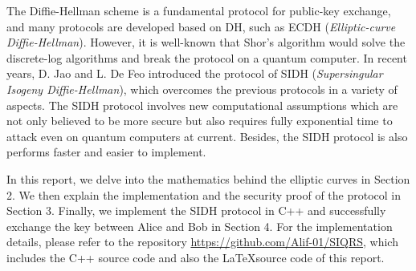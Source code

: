 
The Diffie-Hellman scheme is a fundamental protocol for public-key exchange, and many protocols are developed based on DH, such as ECDH (\textit{Elliptic-curve Diffie-Hellman}). However, it is well-known that Shor's algorithm would solve the discrete-log algorithms and break the protocol on a quantum computer. In recent years, D. Jao and L. De Feo \cite{PQCRYPTO:JaoDeFo11} introduced the protocol of SIDH (\textit{Supersingular Isogeny Diffie-Hellman}), which overcomes the previous protocols in a variety of aspects. The SIDH protocol involves new computational assumptions which are not only believed to be more secure but also requires fully exponential time to attack even on quantum computers at current. Besides, the SIDH protocol is also performs faster and easier to implement.

In this report, we delve into the mathematics behind the elliptic curves in Section 2. We then explain the implementation and the security proof of the protocol in Section 3. Finally, we implement the SIDH protocol in C++ and successfully exchange the key between Alice and Bob in Section 4. For the implementation details, please refer to the repository \url{https://github.com/Alif-01/SIQRS}, which includes the C++ source code and also the \LaTeX source code of this report.